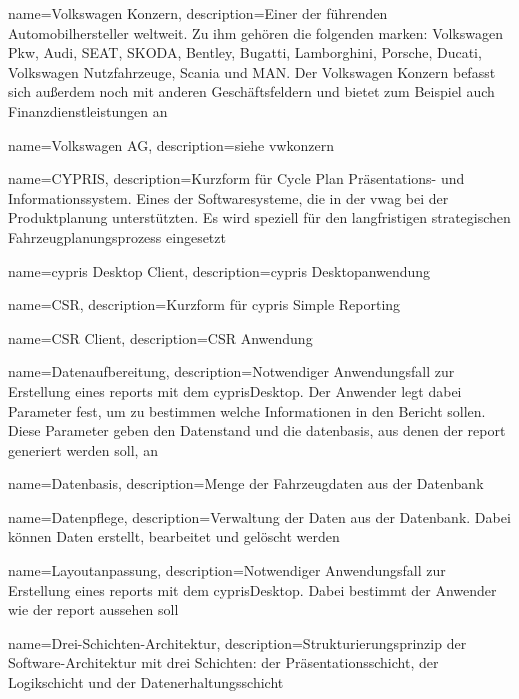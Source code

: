  {
	name=Volkswagen Konzern,
	description={Einer der f\"uhrenden Automobilhersteller weltweit. Zu ihm geh\"oren die folgenden \gls{marke}n: Volkswagen Pkw, Audi, SEAT, SKODA, Bentley, Bugatti, Lamborghini, Porsche, Ducati, Volkswagen Nutzfahrzeuge, Scania und MAN. Der Volkswagen Konzern befasst sich au\ss erdem noch mit anderen Gesch\"aftsfeldern und bietet zum Beispiel auch Finanzdienstleistungen an}}

 {
	name=Volkswagen AG,
	description={siehe \gls{vwkonzern}}}

 {
	name=\mbox{CYPRIS},
	description={Kurzform f\"ur Cycle Plan Pr\"asentations- und Informationssystem. Eines der Softwaresysteme, die in der \gls{vwag} bei der Produktplanung unterst\"utzten. Es wird speziell f\"ur den langfristigen strategischen Fahrzeugplanungsprozess eingesetzt}}
	
 {
	name=\gls{cypris} Desktop Client,
	description={\gls{cypris} Desktopanwendung}}

 {
	name=CSR,
	description={Kurzform f\"ur \gls{cypris} Simple Reporting}}

 {
	name=CSR Client,
	description={CSR Anwendung}}


 {
	name=Datenaufbereitung,
	description={Notwendiger Anwendungsfall zur Erstellung eines \gls{report}s mit dem \gls{cyprisDesktop}. Der Anwender legt dabei Parameter fest, um zu bestimmen welche Informationen in den Bericht sollen. Diese Parameter geben den Datenstand und die \gls{datenbasis}, aus denen der \gls{report} generiert werden soll, an}}
	
 {
	name=Datenbasis,
	description={Menge der Fahrzeugdaten aus der Datenbank}}
	
 {
	name=Datenpflege,
	description={Verwaltung der Daten aus der Datenbank. Dabei k\"onnen Daten erstellt, bearbeitet und gel\"oscht werden}}

 {
	name=Layoutanpassung,
	description={Notwendiger Anwendungsfall zur Erstellung eines \gls{report}s mit dem \gls{cyprisDesktop}. Dabei bestimmt der Anwender wie der \gls{report} aussehen soll}}

 {
	name=Drei-Schichten-Architektur,
	description={Strukturierungsprinzip der Software-Architektur mit drei Schichten: der Pr\"asentationsschicht, der Logikschicht und der Datenerhaltungsschicht}}


